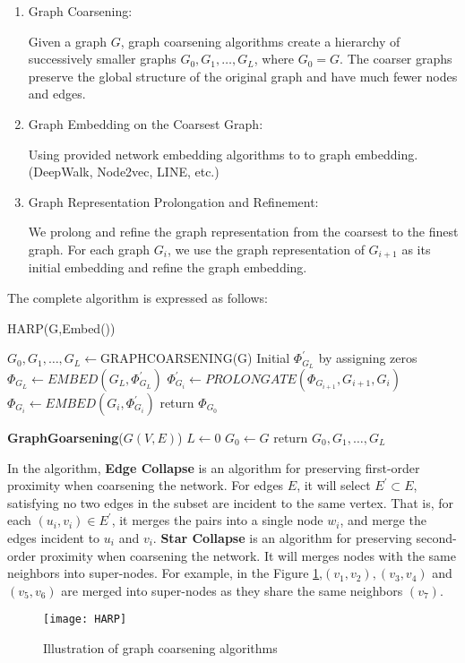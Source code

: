 \documentclass[conference]{IEEEtran}
\begin{document}
\begin{enumerate}
	\item Graph Coarsening:
	
	Given a graph $G$, graph coarsening algorithms create a hierarchy of successively smaller graphs $G_0,G_1,\ldots,G_L$, where $G_0=G$. The coarser graphs preserve the global structure of the original graph and have much fewer nodes and edges.
	\item Graph Embedding on the Coarsest Graph:
	
	Using provided network embedding algorithms to to graph embedding.(DeepWalk, Node2vec, LINE, etc.)
	\item Graph Representation Prolongation and Refinement:
	
	We prolong and refine the graph representation from the coarsest to the finest graph. For each graph $G_i$, we use the graph representation of $G_{i+1}$ as its initial embedding and refine the graph embedding.
\end{enumerate}
The complete algorithm is expressed as follows:
\begin{algorithm}[h]
  \caption{HARP(G,Embed())}  
  $G_0,G_1,\ldots,G_L\leftarrow$GRAPHCOARSENING(G)\;  
  Initial $\Phi_{G_L}^{'}$ by assigning zeros\;
  $\Phi_{G_L}\leftarrow EMBED(G_L,\Phi_{G_L}^{'})$
  {$\Phi_{G_i}^{'}\leftarrow PROLONGATE(\Phi_{G_{i+1}},G_{i+1},G_i)$\;
  $\Phi_{G_i}\leftarrow EMBED(G_i,\Phi_{G_i}^{'})$
  }
  return $\Phi_{G_0}$\;
  
  \textbf{GraphGoarsening}($G(V,E)$)
  $L\leftarrow 0$\;
  $G_0\leftarrow G$\;
  return $G_0,G_1,\ldots,G_L$\;
\end{algorithm}  

In the algorithm, \textbf{Edge Collapse} is an algorithm for preserving first-order proximity when coarsening the network. For edges $E$, it will select $E^{'}\subset E$, satisfying no two edges in the subset are incident to the same vertex. That is, for each $(u_i,v_i)\in E^{'}$, it merges the pairs into a single node $w_i$, and merge the edges incident to $u_i$ and $v_i$. \textbf{Star Collapse} is an algorithm for preserving second-order proximity when coarsening the network. It will merges nodes with the same neighbors into super-nodes. For example, in the Figure \ref{fig_HARP},$(v_1,v_2),(v_3,v_4)$ and $(v_5,v_6)$ are merged into super-nodes as they share the same neighbors $(v_7)$.
\begin{figure}[h]
\centering
\texttt{[image: HARP]}
\caption{Illustration of graph coarsening algorithms}
\label{fig_HARP}
\end{figure}
\end{document}

